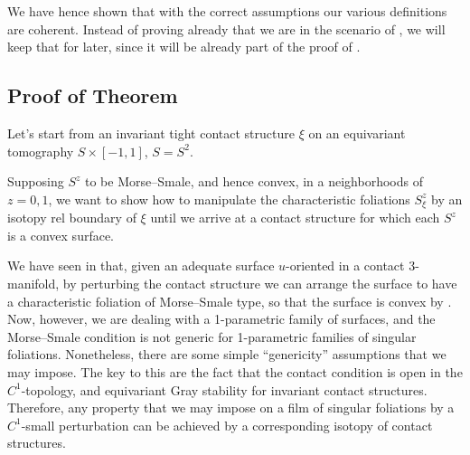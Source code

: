 \documentclass[a4paper, 11pt]{amsart}
\theoremstyle{plain}
\theoremstyle{definition}
\begin{document}
We have hence shown that with the correct assumptions our various definitions are coherent. Instead of proving already that we are in the scenario of , we will keep that for later, since it will be already part of the proof of .
\subsection{Proof of Theorem }



Let's start from an invariant tight contact structure $\xi$ on an equivariant tomography $S \times [-1, 1]$, $S = S^2$.


Supposing $S^{z}$ to be Morse--Smale, and hence convex, in a neighborhoods of $z=0,1$, we want to show how to manipulate the characteristic foliations $S_\xi^z$ by an isotopy rel boundary of $\xi$ until we arrive at a contact structure for which each $S^z$ is a convex surface.

We have seen in  that, given an adequate surface $u$-oriented in a contact 3-manifold, by perturbing the contact structure we can arrange the surface to have a characteristic foliation of Morse--Smale type, so that the surface is convex by . Now, however, we are dealing with a 1-parametric family of surfaces, and the Morse–Smale condition is not generic for 1-parametric families of singular foliations. Nonetheless, there are some simple ``genericity'' assumptions that we may impose. The key to this are the fact that the contact condition is open in the $C^1$-topology, and equivariant Gray stability for invariant contact structures. Therefore, any property that we may impose on a film of singular foliations by a $C^1$-small perturbation can be achieved by a corresponding isotopy of contact structures. 
\end{document}
